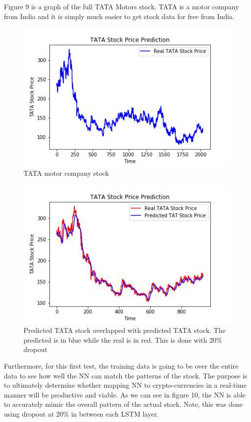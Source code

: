 \documentclass[12pt]{article}
\begin{document}
Figure 9 is a graph of the full TATA Motors stock. TATA is a motor company from India and it is simply much easier to get stock data for free from India. 
\begin{figure}[H]
  \includegraphics[width=\linewidth]{images/TI.png}
  \caption{TATA motor company stock}
\end{figure}

\begin{figure}[H]
  \includegraphics[width=\linewidth, scale=.5]{images/T1.png}
  \caption{Predicted TATA stock overlapped with predicted TATA stock. The predicted is in blue while the real is in red. This is done with 20\% dropout}
\end{figure}

Furthermore, for this first test, the training data is going to be over the entire data to see how well the NN can match the patterns of the stock. The purpose is to ultimately determine whether mapping NN to crypto-currencies in a real-time manner will be productive and viable. As we can see in figure 10, the NN is able to accurately mimic the overall pattern of the actual stock. Note, this was done using dropout at 20\% in between each LSTM layer. 
\end{document}
